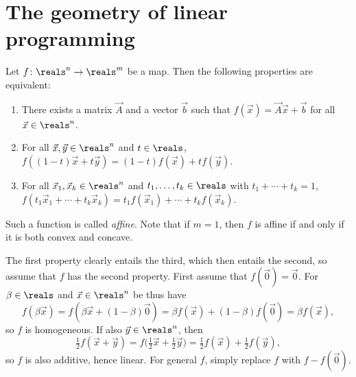 \documentclass[article, a4paper, 11pt, oneside]{memoir}
\title{\doctitle}
\author{\docauthor}
\numberwithin{equation}{chapter}
\theoremstyle{nonumberplain}
\begin{document}
\maketitle

\addtocounter{chapter}{1}
\chapter{The geometry of linear programming}

\newcommand{\keyword}[1]{{\bfseries \textit{#1}}}
\newcommand{\mat}{\vec}


\begin{remark}
    Let $f \colon \reals^n \to \reals^m$ be a map. Then the following properties are equivalent:
    \begin{enumerate}
        \item There exists a matrix $\mat{A}$ and a vector $\vec{b}$ such that $f(\vec{x}) = \mat{A}\vec{x} + \vec{b}$ for all $\vec{x} \in \reals^n$.
        
        \item For all $\vec{x},\vec{y} \in \reals^n$ and $t \in \reals$, $f((1-t)\vec{x} + t\vec{y}) = (1-t)f(\vec{x}) + tf(\vec{y})$.

        \item For all $\vec{x}_1,\vec{x}_k \in \reals^n$ and $t_1, \ldots, t_k \in \reals$ with $t_1 + \cdots + t_k = 1$, $f(t_1 \vec{x}_1 + \cdots + t_k \vec{x}_k) = t_1 f(\vec{x}_1) + \cdots + t_k f(\vec{x}_k)$.
    \end{enumerate}
    Such a function is called \emph{affine}. Note that if $m = 1$, then $f$ is affine if and only if it is both convex and concave.
    
    The first property clearly entails the third, which then entails the second, so assume that $f$ has the second property. First assume that $f(\vec{0}) = \vec{0}$. For $\beta \in \reals$ and $\vec{x} \in \reals^n$ be thus have
    \begin{equation*}
        f(\beta \vec{x})
            = f(\beta \vec{x} + (1-\beta)\vec{0})
            = \beta f(\vec{x}) + (1-\beta)f(\vec{0})
            = \beta f(\vec{x}),
    \end{equation*}
    so $f$ is homogeneous. If also $\vec{y} \in \reals^n$, then
    \begin{equation*}
        \tfrac{1}{2} f(\vec{x} + \vec{y})
            = f \bigl( \tfrac{1}{2} \vec{x} + \tfrac{1}{2} \vec{y} \bigr)
            = \tfrac{1}{2} f(\vec{x}) + \tfrac{1}{2} f(\vec{y}),
    \end{equation*}
    so $f$ is also additive, hence linear. For general $f$, simply replace $f$ with $f - f(\vec{0})$.
\end{remark}
\end{document}

